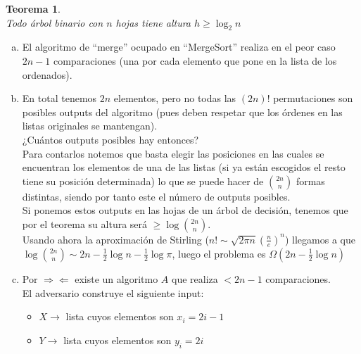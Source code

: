 \documentclass[dcc,uchile]{fcfmcourse}
\theoremstyle{plain}
\newtheorem{teo}{Teorema}
\theoremstyle{definition}
\begin{document}
\begin{problems}
\problem 
\begin{teo}\jewel\\
Todo árbol binario con $n$ hojas tiene altura $h \ge \log_{2} n$
\end{teo}
\begin{enumerate}[a)]
    \item El algoritmo de ``merge'' ocupado en ``MergeSort'' realiza en el peor caso $2n-1$ comparaciones (una por cada elemento que pone en la lista de los ordenados). \flash
    
    \item En total tenemos $2n$ elementos, pero no todas las $(2n)!$ permutaciones son posibles outputs del algoritmo (pues deben respetar que los órdenes en las listas originales se mantengan).\\    
    
    ¿Cuántos outputs posibles hay entonces? \thinking \\
    Para contarlos notemos que basta elegir las posiciones en las cuales se encuentran los elementos de una de las listas (si ya están escogidos el resto tiene su posición determinada) lo que se puede hacer de $\binom{2n}{n}$ formas distintas, siendo por tanto este el número de outputs posibles.\\    
    Si ponemos estos outputs en las hojas de un árbol de decisión, tenemos que por el teorema \jewel su altura será $\ge \log \binom{2n}{n}$.\\    
    
    Usando ahora la aproximación de Stirling ($n! \sim \sqrt{2\pi n} \left(\frac{n}{e}\right)^n$) llegamos a que $\log \binom{2n}{n} \sim 2n - \frac{1}{2}\log n - \frac{1}{2}\log \pi$, luego el problema es $\Omega( 2n - \frac{1}{2}\log n)$
    \item Por $\Rightarrow \Leftarrow$ existe un algoritmo $A$ que realiza $< 2n-1$  comparaciones.\\
    
    El adversario \demon  construye el siguiente input:
    \begin{itemize}
        \item $X \rightarrow$ lista cuyos elementos son $x_{i} = 2i-1$
        \item $Y \rightarrow$ lista cuyos elementos son $y_{i} = 2i$
    \end{itemize}
    

\end{enumerate}
\end{problems}
\end{document}
